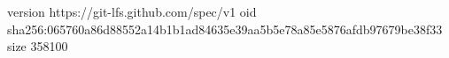version https://git-lfs.github.com/spec/v1
oid sha256:065760a86d88552a14b1b1ad84635e39aa5b5e78a85e5876afdb97679be38f33
size 358100
